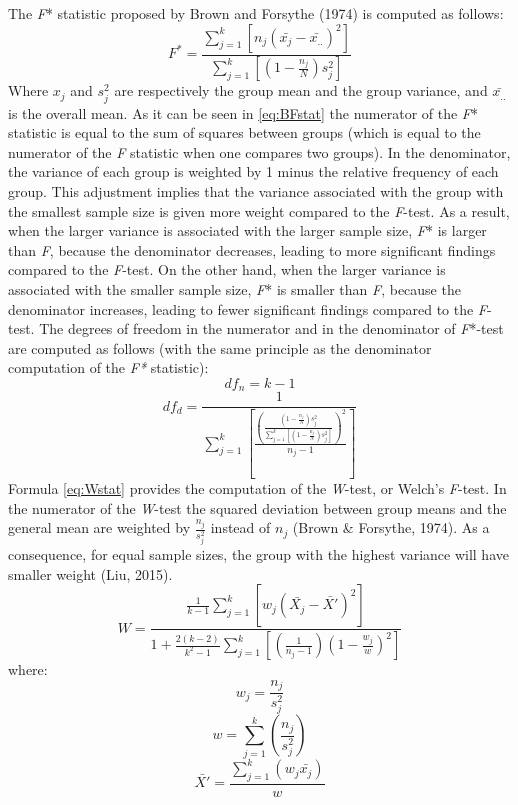 \documentclass[man,floatsintext]{apa6}
\begin{document}
The \emph{F}* statistic proposed by Brown and Forsythe (1974) is computed as follows:
\begin{equation} 
F^*= \frac{\sum_{j=1}^k[n_j(\bar{x_j}-\bar{x_{..}})^2]}{\sum_{j=1}^k [(1-\frac{n_j}{N})s_j^2]}
\label{eq:BFstat}
\end{equation}
Where \(x_j\) and \(s_j^2\) are respectively the group mean and the group variance, and \(\bar{x_{..}}\) is the overall mean. As it can be seen in \eqref{eq:BFstat} the numerator of the \emph{F}* statistic is equal to the sum of squares between groups (which is equal to the numerator of the \emph{F} statistic when one compares two groups). In the denominator, the variance of each group is weighted by 1 minus the relative frequency of each group. This adjustment implies that the variance associated with the group with the smallest sample size is given more weight compared to the \emph{F}-test. As a result, when the larger variance is associated with the larger sample size, \emph{F}* is larger than \emph{F}, because the denominator decreases, leading to more significant findings compared to the \emph{F}-test. On the other hand, when the larger variance is associated with the smaller sample size, \emph{F}* is smaller than \emph{F}, because the denominator increases, leading to fewer significant findings compared to the \emph{F}-test. The degrees of freedom in the numerator and in the denominator of \emph{F}*-test are computed as follows (with the same principle as the denominator computation of the \emph{F*} statistic):
\begin{equation} 
df_n= k-1
\label{eq:BFnumDF}
\end{equation}
\begin{equation} 
df_d= \frac{1}{\sum_{j=1}^k[\frac{(\frac{(1-\frac{n_j}{N})s_j^2}{\sum_{j=1}^k[(1-\frac{n_j}{N})s_j^2]})^2}{n_j-1}]}
\label{eq:BFdenomDF}
\end{equation}
Formula \eqref{eq:Wstat} provides the computation of the \emph{W}-test, or Welch's \emph{F}-test. In the numerator of the \emph{W}-test the squared deviation between group means and the general mean are weighted by \(\frac{n_j}{s_j^2}\) instead of \(n_j\) (Brown \& Forsythe, 1974). As a consequence, for equal sample sizes, the group with the highest variance will have smaller weight (Liu, 2015). \begin{equation} 
W=\frac{\frac{1}{k-1}\sum_{j=1}^k[w_j(\bar{X_j}-\bar{X'})^2]}
{1+\frac{2(k-2)}{k^2-1}\sum_{j=1}^k[(\frac{1}{n_j-1})(1-\frac{w_j}{w})^2]}
\label{eq:Wstat}
\end{equation}
where:
\[w_j=\frac{n_j}{s_j^2}\]
\[w=\sum_{j=1}^k(\frac{n_j}{s_j^2})\]
\[\bar{X'}=\frac{\sum_{j=1}^k(w_j\bar{x_j})}{w}\]
\end{document}
